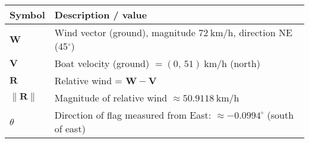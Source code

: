 
\centering
\begin{tabular}{@{}ll@{}}
\toprule
Symbol & Description / value \\ \midrule
$\mathbf{W}$ & Wind vector (ground), magnitude $72\ \mathrm{km/h}$, direction NE (45$^\circ$) \\
$\mathbf{V}$ & Boat velocity (ground) $= (0,\,51)\ \mathrm{km/h}$ (north) \\
$\mathbf{R}$ & Relative wind = $\mathbf{W}-\mathbf{V}$ \\
$\|\mathbf{R}\|$ & Magnitude of relative wind $\approx 50.9118\ \mathrm{km/h}$ \\
$\theta$ & Direction of flag measured from East: $\approx -0.0994^\circ$ (south of east) \\ \bottomrule
\end{tabular}
